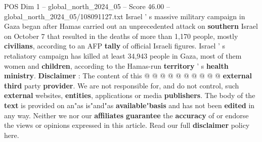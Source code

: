 \begin{textsample}{POS Dim 1 – global\_north\_2024\_05 – Score 46.00 – global\_north\_2024\_05/108091127.txt}
Israel ' s massive military campaign in Gaza began after Hamas carried out an unprecedented attack on \textbf{southern} Israel on October 7 that resulted in the deaths of more than 1,170 people, mostly \textbf{civilians}, according to an AFP \textbf{tally} of official Israeli figures.
Israel ' s retaliatory campaign has killed at least 34,943 people in Gaza, most of them women and \textbf{children}, according to the Hamas-run \textbf{territory} ' s \textbf{health} \textbf{ministry}. \textbf{Disclaimer} : The content of this @ @ @ @ @ @ @ @ @ @ \textbf{external} \textbf{third} party \textbf{provider}.
We are not responsible for, and do not control, such \textbf{external} websites, \textbf{entities}, applications or media \textbf{publishers}.
The body of the \textbf{text} is provided on an"as is"and"as \textbf{available}"\textbf{basis} and has not been \textbf{edited} in any way.
Neither we nor our \textbf{affiliates} \textbf{guarantee} the \textbf{accuracy} of or endorse the views or opinions expressed in this article.
Read our full \textbf{disclaimer} policy here.

\end{textsample}
